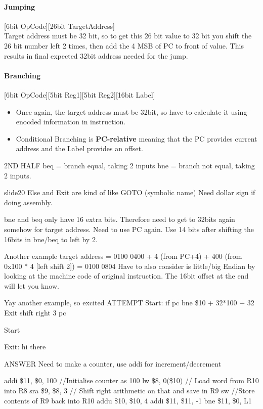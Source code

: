 \documentclass{article}
\newcommand\tab[1][0.5cm]{\hspace*{#1}}
\begin{document}
			\paragraph{\tab Jumping} [6bit OpCode][26bit TargetAddress]\\ Target address must be 32 bit, so to get this 26 bit value to 32 bit you shift the 26 bit number left 2 times, then add the 4 MSB of PC to front of value. This results in final expected 32bit address needed for the jump.

			\paragraph{\tab Branching} [6bit OpCode][5bit Reg1][5bit Reg2][16bit Label]
			\begin{itemize}
				\item Once again, the target address must be 32bit, so have to calculate it using enocded information in instruction.
				\item Conditional Branching is \textbf{PC-relative} meaning that the PC provides current address and the Label provides an offset.
			\end{itemize}






2ND HALF
	beq = branch equal, taking 2 inputs
	bne = branch not equal, taking 2 inputs.

slide20
	Else and Exit are kind of like GOTO (symbolic name) Need dollar sign if doing assembly.

	bne and beq only have 16 extra bits.  Therefore need to get to 32bits again somehow for target address. Need to use PC again. Use 14 bits after shifting the 16bits in bne/beq to left by 2.

	Another example
	target address =
		0100 0400 + 4 (from PC+4) + 400 (from 0x100 * 4 [left shift 2])
		= 0100 0804
	Have to also consider is little/big Endian by looking at the machine code of original instruction. The 16bit offset at the end will let you know.

	Yay another example, so excited
		ATTEMPT
			Start: if pc bne \$10 + 32*100 + 32 Exit
				shift right 3 pc

			Start

			Exit: hi there

		ANSWER
			Need to make a counter, use addi for increment/decrement

			addi \$11, \$0, 100	\tab //Initialise counter as 100
			lw \$8, 0(\$10)	\tab // Load word from R10 into R8
			sra	\$9, \$8, 3	\tab // Shift right arithmetic on that and save in R9
			sw 	\tab //Store contents of R9 back into R10
			addu \$10, \$10, 4
			addi \$11, \$11, -1
			bne \$11, \$0, L1
\end{document}
